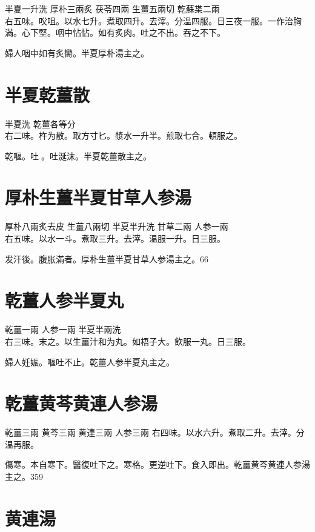 半夏{\scriptsize 一升洗} 厚朴{\scriptsize 三兩炙} 茯苓{\scriptsize 四兩} 生薑{\scriptsize 五兩切} 乾蘇枼{\scriptsize 二兩}\\
右五味。㕮咀。以水七升。煮取四升。去滓。分温四服。日三夜一服。{\scriptsize 一作治胸滿。心下堅。咽中怗怗。如有炙肉。吐之不出。吞之不下。}

婦人咽中如有炙臠。半夏厚朴湯主之。

\section{半夏乾薑散}

半夏{\scriptsize 洗} 乾薑{\scriptsize 各等分}\\
右二味。杵为散。取方寸匕。漿水一升半。煎取七合。頓服之。

乾嘔。吐{\sungtpii 𠱘}。吐涎沫。半夏乾薑散主之。

\section{厚朴生薑半夏甘草人参湯}

厚朴{\scriptsize 八兩炙去皮} 生薑{\scriptsize 八兩切} 半夏{\scriptsize 半升洗} 甘草{\scriptsize 二兩} 人参{\scriptsize 一兩}\\
右五味。以水一斗。煮取三升。去滓。温服一升。日三服。

发汗後。腹胀滿者。厚朴{\khaaitp 生薑半夏甘草人参}湯主之。66

\section{乾薑人参半夏丸}

乾薑{\scriptsize 一兩} 人参{\scriptsize 一兩} 半夏{\scriptsize 半兩洗}\\
右三味。末之。以生薑汁和为丸。如梧子大。飲服一丸。日三服。

{\khaaitp 婦人}妊娠。嘔吐不止。乾薑人参半夏丸主之。

\section{乾薑黄芩黄連人参湯}

乾薑{\scriptsize 三兩} 黄芩{\scriptsize 三兩} 黄連{\scriptsize 三兩} 人参{\scriptsize 三兩}
右四味。以水六升。煮取二升。去滓。分温再服。

傷寒。本自寒下。醫復吐{\khaaitp 下}之。寒格。更逆吐{\khaaitp 下}。食入即出。乾薑黄芩黄連人参湯主之。359

\section{黄連湯}

